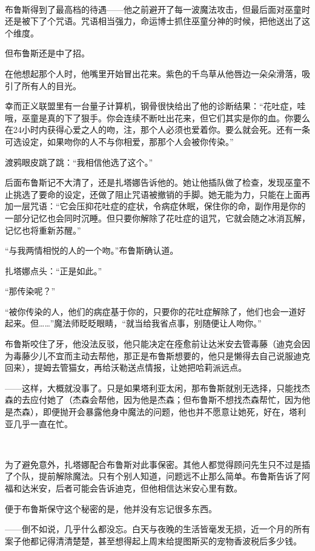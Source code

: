 \documentclass[../main.tex]{subfiles}
\begin{document}
~\

布鲁斯得到了最高档的待遇——他之前避开了每一波魔法攻击，但最后面对巫童时还是被下了个咒语。咒语相当强力，命运博士抓住巫童分神的时候，把他送出了这个维度。

但布鲁斯还是中了招。

在他想起那个人时，他嘴里开始冒出花来。紫色的千鸟草从他唇边一朵朵滑落，吸引了所有人的目光。

幸而正义联盟里有一台量子计算机，钢骨很快给出了他的诊断结果：“花吐症，哇哦，巫童是真的下了狠手。你会连续不断吐出花来，但它们其实是你的血。你要么在24小时内获得心爱之人的吻，注，那个人必须也爱着你。要么就会死。还有一条可选设定，如果吻你的人不与你相爱，那那个人会被你传染。”

渡鸦眼皮跳了跳：“我相信他选了这个。”

后面布鲁斯记不大清了，还是扎塔娜告诉他的。她让他插队做了检查，发现巫童不止挑选了要命的设定，还做了阻止咒语被撤销的手脚。她无能为力，只能在上面再加一层咒语：“它会压抑花吐症的症状，令病症休眠，保住你的命，副作用是你的一部分记忆也会同时沉睡。但只要你解除了花吐症的诅咒，它就会随之冰消瓦解，记忆也将重新苏醒。”

“与我两情相悦的人的一个吻。”布鲁斯确认道。

扎塔娜点头：“正是如此。”

“那传染呢？”

“被你传染的人，他们的病症基于你的，只要你的花吐症解除了，他们也会一道好起来。但……”魔法师眨眨眼睛，“就当给我省点事，别随便让人吻你。”

布鲁斯咬住了牙，他没法反驳，他只能决定在痊愈前让达米安去管毒藤（迪克会因为毒藤少儿不宜而主动去帮他，那正是布鲁斯想要的，他只是懒得去自己说服迪克回来），提姆去管猫女，再给沃勒送点情报，让她把哈莉派远点。

——这样，大概就没事了。只是如果塔利亚太闲，那布鲁斯就别无选择，只能找杰森的去应付她了（杰森会帮他，因为他是杰森；但布鲁斯不想找杰森帮忙，因为他是杰森），即便抛开会暴露他身中魔法的问题，他也并不愿意让她死，好在，塔利亚几乎一直在忙。

~\

为了避免意外，扎塔娜配合布鲁斯对此事保密。其他人都觉得顾问先生只不过是插了个队，提前解除魔法。只有个别人知道，问题远不止那么简单。布鲁斯告诉了阿福和达米安，后者可能会告诉迪克，但他相信达米安心里有数。

便于布鲁斯保守这个秘密的是，他并没有忘记很多东西。

——倒不如说，几乎什么都没忘。白天与夜晚的生活皆毫发无损，近一个月的所有案子他都记得清清楚楚，甚至想得起上周末给提图斯买的宠物香波税后多少钱。
\end{document}
